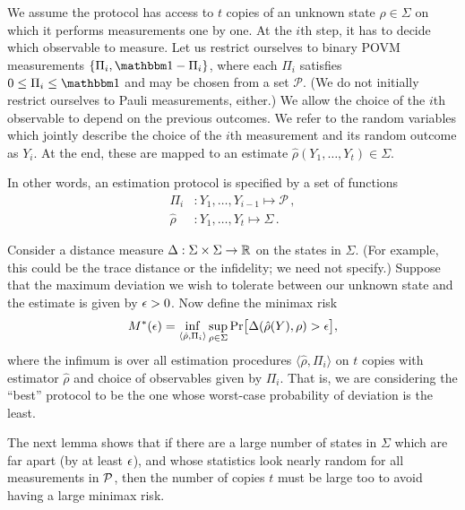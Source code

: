 We assume the protocol has access to $t$ copies of an unknown state $\rho\in\Sigma$ on which it performs measurements one by one. At the $i$th step, it has to decide which observable to measure. Let us  restrict ourselves to binary POVM measurements $\{\Pi_i, \Id-\Pi_i\}$, where each $\Pi_i$ satisfies $0\le \Pi_i \le \Id$ and may be chosen from a set $\mathcal{P}$. (We do not initially restrict ourselves to Pauli measurements, either.) We allow the choice of the $i$th observable to depend on the previous outcomes. We refer to the random variables which jointly describe the choice of the $i$th measurement and its random outcome as $Y_i$. At the end, these are mapped to an estimate $\hat\rho(Y_1, \dots, Y_t)\in \Sigma$.

In other words, an estimation protocol is specified by a set of functions
\begin{align*}
	\Pi_i&: Y_1, \dots, Y_{i-1} \mapsto \mathcal{P}\,, \\
	\hat\rho&: Y_1, \dots, Y_t \mapsto \Sigma\,.
\end{align*}

Consider a distance measure $\Delta:\Sigma\times\Sigma \to \RR$ on the states in $\Sigma$. (For example, this could be the trace distance or the infidelity; we need not specify.) Suppose that the maximum deviation we wish to tolerate between our unknown state and the estimate is given by $\eps>0$. Now define the minimax risk
\begin{align}\label{eqn:protocol}
	M^*(\eps) = \inf_{\langle \hat \rho, \Pi_i \rangle} 
	\sup_{\rho\in\Sigma} \Pr\bigl[ \Delta(\hat\rho(Y), \rho) > \eps\bigr],
\end{align}
where the infimum is over all estimation procedures $\langle \hat
\rho, \Pi_i\rangle$ on $t$ copies with estimator $\hat\rho$ and
choice of observables given by $\Pi_i$. That is, we are considering the ``best'' protocol to be the one whose worst-case probability of deviation is the least. 

The next lemma shows that if there are a large number of states in $\Sigma$ which are far apart (by at least $\eps$), and whose statistics look nearly random for all measurements in $\P$, then the number of copies $t$ must be large too to avoid having a large minimax risk.

